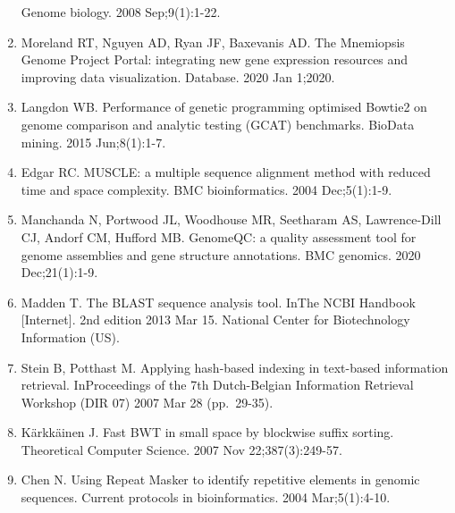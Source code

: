 \documentclass[
]{article}
\begin{document}
\begin{enumerate}
  Genome biology. 2008 Sep;9(1):1-22.
\item
  Moreland RT, Nguyen AD, Ryan JF, Baxevanis AD. The Mnemiopsis Genome
  Project Portal: integrating new gene expression resources and
  improving data visualization. Database. 2020 Jan 1;2020.
\item
  Langdon WB. Performance of genetic programming optimised Bowtie2 on
  genome comparison and analytic testing (GCAT) benchmarks. BioData
  mining. 2015 Jun;8(1):1-7.
\item
  Edgar RC. MUSCLE: a multiple sequence alignment method with reduced
  time and space complexity. BMC bioinformatics. 2004 Dec;5(1):1-9.
\item
  Manchanda N, Portwood JL, Woodhouse MR, Seetharam AS, Lawrence-Dill
  CJ, Andorf CM, Hufford MB. GenomeQC: a quality assessment tool for
  genome assemblies and gene structure annotations. BMC genomics. 2020
  Dec;21(1):1-9.
\item
  Madden T. The BLAST sequence analysis tool. InThe NCBI Handbook
  {[}Internet{]}. 2nd edition 2013 Mar 15. National Center for
  Biotechnology Information (US).
\item
  Stein B, Potthast M. Applying hash-based indexing in text-based
  information retrieval. InProceedings of the 7th Dutch-Belgian
  Information Retrieval Workshop (DIR 07) 2007 Mar 28 (pp.~29-35).
\item
  Kärkkäinen J. Fast BWT in small space by blockwise suffix sorting.
  Theoretical Computer Science. 2007 Nov 22;387(3):249-57.
\item
  Chen N. Using Repeat Masker to identify repetitive elements in genomic
  sequences. Current protocols in bioinformatics. 2004 Mar;5(1):4-10.
\end{enumerate}
\end{document}
